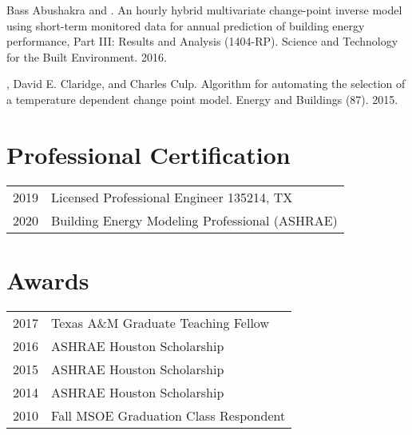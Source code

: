 \documentclass[]{deedy-resume-openfont}
\begin{document}
\begin{minipage}[t]{0.66\textwidth}
Bass Abushakra and . An hourly hybrid
multivariate change-point inverse model using short-term monitored data for
annual prediction of building energy performance, {Part III}: Results and Analysis
({1404-RP}). Science and Technology for the Built Environment. 2016.
\sectionsep

, David E. Claridge, and Charles Culp. Algorithm
for automating the selection of a temperature dependent change point model.
Energy and Buildings (87). 2015.





\section{Professional Certification}

\begin{tabular}{rl}
    2019 & Licensed Professional Engineer 135214, TX \\
    2020 & Building Energy Modeling Professional (ASHRAE) \\
\end{tabular}

\section{Awards}

\begin{tabular}{rl}
    2017 & Texas A\&M Graduate Teaching Fellow                   \\
    2016 & ASHRAE Houston Scholarship                            \\
    2015 & ASHRAE Houston Scholarship                            \\
    2014 & ASHRAE Houston Scholarship                            \\
    2010 & Fall MSOE Graduation Class Respondent \\
\end{tabular}


\end{minipage}
\end{document}
